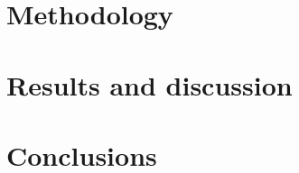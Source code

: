\documentclass[twoside,twocolumn,9pt]{article}
\renewcommand{\refname}{Notes and references}
\begin{document}
\section{Methodology}

\section{Results and discussion}

\section{Conclusions}



\balance



\newpage
\appendix
{}
\renewcommand{\thesection}{A.\arabic{section}}
\end{document}
